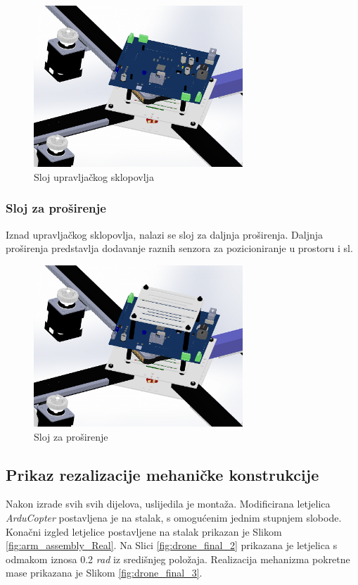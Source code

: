 \documentclass[11pt,a4paper]{article}
\begin{document}
\begin{figure}[H]
	\centering
	\includegraphics[width=0.7\textwidth]{figures/arducopter_slot_pcb.png}
	\caption{Sloj upravljačkog sklopovlja}
	\label{fig:slot_pcb}
\end{figure}

\subsubsection{Sloj za proširenje}
Iznad upravljačkog sklopovlja, nalazi se sloj za daljnja proširenja. Daljnja proširenja predstavlja dodavanje raznih senzora za pozicioniranje u prostoru i sl. 

\begin{figure}[H]
	\centering
	\includegraphics[width=0.7\textwidth]{figures/arducopter_slot_top.png}
	\caption{Sloj za proširenje}
	\label{fig:slot_top}
\end{figure}

\subsection{Prikaz rezalizacije mehaničke konstrukcije}
Nakon izrade svih svih dijelova, uslijedila je montaža. Modificirana letjelica \textit{ArduCopter} postavljena je na stalak, s omogućenim jednim stupnjem slobode. Konačni izgled letjelice postavljene na stalak prikazan je Slikom \ref{fig:arm_assembly_Real}. Na Slici \ref{fig:drone_final_2} prikazana je letjelica s odmakom iznosa 0.2 \textit{rad} iz središnjeg položaja. Realizacija mehanizma pokretne mase prikazana je Slikom \ref{fig:drone_final_3}.
\end{document}
